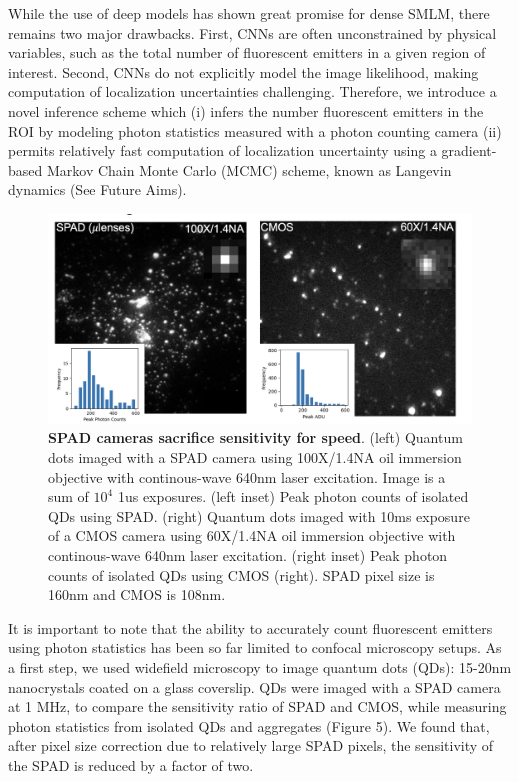 \documentclass{ucetd}
\begin{document}
While the use of deep models has shown great promise for dense SMLM, there remains two major drawbacks. First, CNNs are often unconstrained by physical variables, such as the total number of fluorescent emitters in a given region of interest. Second, CNNs do not explicitly model the image likelihood, making computation of localization uncertainties challenging. Therefore, we introduce a novel inference scheme which (i) infers the number fluorescent emitters in the ROI by modeling photon statistics measured with a photon counting camera (ii) permits relatively fast computation of localization uncertainty using a gradient-based Markov Chain Monte Carlo (MCMC) scheme, known as Langevin dynamics (See Future Aims).

\begin{figure}
\begin{center}
\includegraphics[width=15cm]{SPADvCMOS.png}
\end{center}
\caption{\textbf{SPAD cameras sacrifice sensitivity for speed}. (left) Quantum dots imaged with a SPAD camera using 100X/1.4NA oil immersion objective with continous-wave 640nm laser excitation. Image is a sum of $10^{4}$ 1us exposures. (left inset) Peak photon counts of isolated QDs using SPAD. (right) Quantum dots imaged with 10ms exposure of a CMOS camera using 60X/1.4NA oil immersion objective with continous-wave 640nm laser excitation. (right inset) Peak photon counts of isolated QDs using CMOS (right). SPAD pixel size is 160nm and CMOS is 108nm.}
\end{figure}


It is important to note that the ability to accurately count fluorescent emitters using photon statistics has been so far limited to confocal microscopy setups. As a first step, we used widefield microscopy to image quantum dots (QDs): 15-20nm nanocrystals coated on a glass coverslip. QDs were imaged with a SPAD camera at 1 MHz, to compare the sensitivity ratio of SPAD and CMOS, while measuring photon statistics from isolated QDs and aggregates (Figure 5). We found that, after pixel size correction due to relatively large SPAD pixels, the sensitivity of the SPAD is reduced by a factor of two.
\end{document}
